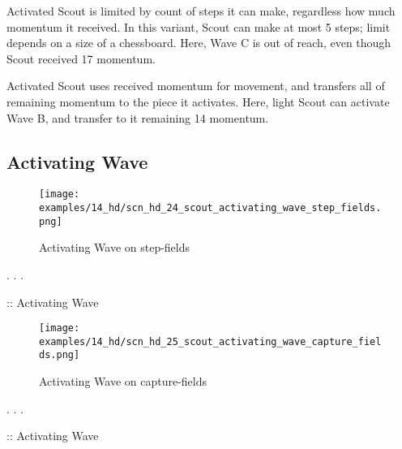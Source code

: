 \vspace*{-0.5\baselineskip}
Activated Scout is limited by count of steps it can make, regardless how much
momentum it received. In this variant, Scout can make at most 5 steps; limit
depends on a size of a chessboard. Here, Wave C is out of reach, even though
Scout received 17 momentum.

Activated Scout uses received momentum for movement, and transfers all of
remaining momentum to the piece it activates. Here, light Scout can activate
Wave B, and transfer to it remaining 14 momentum.

\clearpage %

\subsection*{Activating Wave}
\label{sec:Hemera's Dawn/Scout/Activating Wave}

\vspace*{-1.3\baselineskip}
\noindent
\begin{figure}[!h]
\texttt{[image: examples/14\_hd/scn\_hd\_24\_scout\_activating\_wave\_step\_fields.png]}
\vspace*{-1.3\baselineskip}
\caption{Activating Wave on step-fields}
\label{fig:scn_hd_24_scout_activating_wave_step_fields}
\end{figure}

\vspace*{-0.5\baselineskip}
. . .

\TODO :: Activating Wave

\clearpage %

\vspace*{-2.3\baselineskip}
\noindent
\begin{figure}[!h]
\texttt{[image: examples/14\_hd/scn\_hd\_25\_scout\_activating\_wave\_capture\_fields.png]}
\vspace*{-1.3\baselineskip}
\caption{Activating Wave on capture-fields}
\label{fig:scn_hd_25_scout_activating_wave_capture_fields}
\end{figure}

\vspace*{-0.5\baselineskip}
. . .

\TODO :: Activating Wave

\clearpage %

